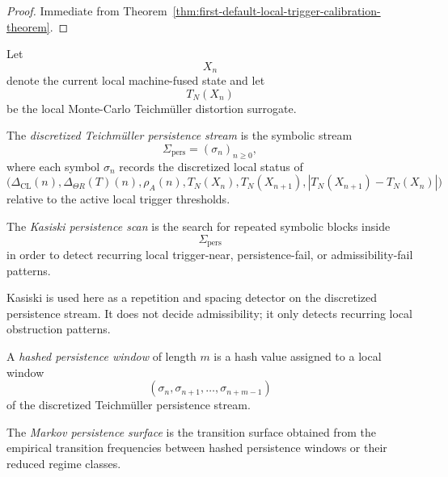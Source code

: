 \begin{proof}
Immediate from Theorem~\ref{thm:first-default-local-trigger-calibration-theorem}.
\end{proof}


\begin{definition}
\label{def:discretized-teichmueller-persistence-stream}
Let
\[
X_n
\]
denote the current local machine-fused state and let
\[
T_N(X_n)
\]
be the local Monte-Carlo Teichm\"uller distortion surrogate.

The \emph{discretized Teichm\"uller persistence stream} is the symbolic stream
\[
\Sigma_{\mathrm{pers}}
=
(\sigma_n)_{n\ge 0},
\]
where each symbol \(\sigma_n\) records the discretized local status of
\[
\bigl(
\Delta_{\mathrm{CL}}(n),
\Delta_{\Theta R}(T)(n),
\rho_A(n),
T_N(X_n),
T_N(X_{n+1}),
|T_N(X_{n+1})-T_N(X_n)|
\bigr)
\]
relative to the active local trigger thresholds.
\end{definition}

\begin{definition}
\label{def:kasiski-persistence-scan}
The \emph{Kasiski persistence scan} is the search for repeated symbolic blocks inside
\[
\Sigma_{\mathrm{pers}}
\]
in order to detect recurring local trigger-near, persistence-fail, or admissibility-fail patterns.
\end{definition}

\begin{remark}
\label{rem:role-of-kasiski}
Kasiski is used here as a repetition and spacing detector on the discretized persistence stream.
It does not decide admissibility; it only detects recurring local obstruction patterns.
\end{remark}

\begin{definition}
\label{def:hashed-persistence-window}
A \emph{hashed persistence window} of length \(m\) is a hash value assigned to a local window
\[
(\sigma_n,\sigma_{n+1},\dots,\sigma_{n+m-1})
\]
of the discretized Teichm\"uller persistence stream.
\end{definition}

\begin{definition}
\label{def:markov-persistence-surface}
The \emph{Markov persistence surface} is the transition surface obtained from the empirical transition frequencies between hashed persistence windows or their reduced regime classes.
\end{definition}

